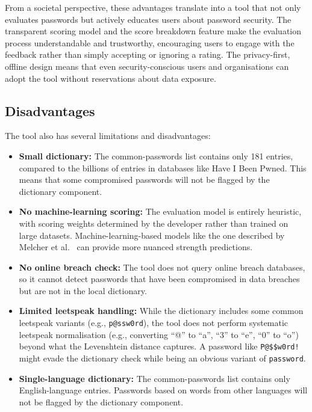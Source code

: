 From a societal perspective, these advantages translate into a tool that not only evaluates passwords but actively educates users about password security. The transparent scoring model and the score breakdown feature make the evaluation process understandable and trustworthy, encouraging users to engage with the feedback rather than simply accepting or ignoring a rating. The privacy-first, offline design means that even security-conscious users and organisations can adopt the tool without reservations about data exposure.

\subsection{Disadvantages}

The tool also has several limitations and disadvantages:

\begin{itemize}
    \item \textbf{Small dictionary:} The common-passwords list contains only 181 entries, compared to the billions of entries in databases like Have I Been Pwned. This means that some compromised passwords will not be flagged by the dictionary component.

    \item \textbf{No machine-learning scoring:} The evaluation model is entirely heuristic, with scoring weights determined by the developer rather than trained on large datasets. Machine-learning-based models like the one described by Melcher et al.\ \cite{melcher2016} can provide more nuanced strength predictions.

    \item \textbf{No online breach check:} The tool does not query online breach databases, so it cannot detect passwords that have been compromised in data breaches but are not in the local dictionary.

    \item \textbf{Limited leetspeak handling:} While the dictionary includes some common leetspeak variants (e.g., \texttt{p@ssw0rd}), the tool does not perform systematic leetspeak normalisation (e.g., converting ``@'' to ``a'', ``3'' to ``e'', ``0'' to ``o'') beyond what the Levenshtein distance captures. A password like \texttt{P@\$\$w0rd!} might evade the dictionary check while being an obvious variant of \texttt{password}.

    \item \textbf{Single-language dictionary:} The common-passwords list contains only English-language entries. Passwords based on words from other languages will not be flagged by the dictionary component.
\end{itemize}

